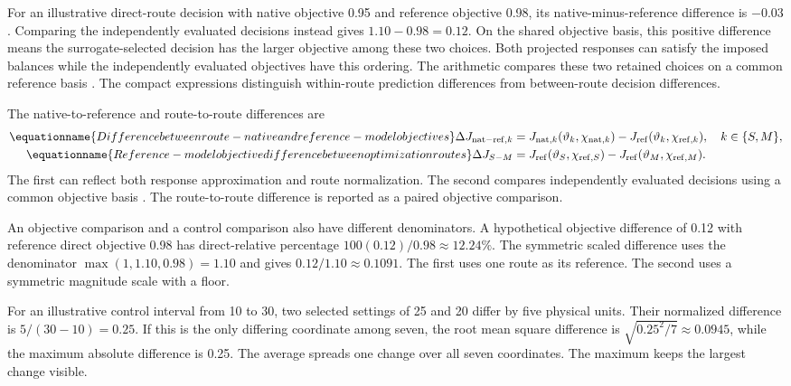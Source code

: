For an illustrative direct-route decision with native objective 0.95 and reference objective 0.98, its native-minus-reference difference is $-0.03$. Comparing the independently evaluated decisions instead gives $1.10-0.98=0.12$. On the shared objective basis, this positive difference means the surrogate-selected decision has the larger objective among these two choices. Both projected responses can satisfy the imposed balances while the independently evaluated objectives have this ordering. The arithmetic compares these two retained choices on a common reference basis \citep{Alexandrov1998,Pedrozo2025}. The compact expressions distinguish within-route prediction differences from between-route decision differences.

The native-to-reference and route-to-route differences are
\begin{align}
\equationname{Difference between route-native and reference-model objectives}
\Delta J_{{\rm nat-ref},k}&=
J_{{\rm nat},k}(\vartheta_k,\chi_{{\rm nat},k})
-J_{\rm ref}(\vartheta_k,\chi_{{\rm ref},k}),\quad k\in\{S,M\},\\
\equationname{Reference-model objective difference between optimization routes}
\Delta J_{S-M}&=J_{\rm ref}(\vartheta_S,\chi_{{\rm ref},S})
-J_{\rm ref}(\vartheta_M,\chi_{{\rm ref},M}).
\label{eq:plant_objective_comparison}
\end{align}
The first can reflect both response approximation and route normalization. The second compares independently evaluated decisions using a common objective basis \citep{BhosekarIerapetritou2018,Pedrozo2025}. The route-to-route difference is reported as a paired objective comparison.

An objective comparison and a control comparison also have different denominators. A hypothetical objective difference of 0.12 with reference direct objective 0.98 has direct-relative percentage $100(0.12)/0.98\approx12.24\%$. The symmetric scaled difference uses the denominator $\max(1,1.10,0.98)=1.10$ and gives $0.12/1.10\approx0.1091$. The first uses one route as its reference. The second uses a symmetric magnitude scale with a floor.

For an illustrative control interval from 10 to 30, two selected settings of 25 and 20 differ by five physical units. Their normalized difference is $5/(30-10)=0.25$. If this is the only differing coordinate among seven, the root mean square difference is $\sqrt{0.25^2/7}\approx0.0945$, while the maximum absolute difference is 0.25. The average spreads one change over all seven coordinates. The maximum keeps the largest change visible.

